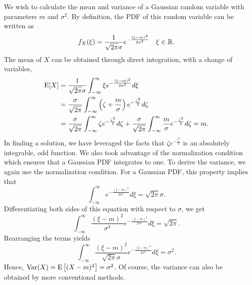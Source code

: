 \begin{example}
We wish to calculate the mean and variance of a Gaussian random variable with parameters $m$ and $\sigma^2$.
By definition, the PDF of this random variable can be written as
\begin{equation*}
f_X (\xi) = \frac{1}{\sqrt{2 \pi} \sigma} e^{-\frac{(\xi - m)^2}{2\sigma^2}}
\quad \xi \in \mathbb{R} .
\end{equation*}
The mean of $X$ can be obtained through direct integration, with a change of variables,
\begin{equation*}
\begin{split}
\mathrm{E} [X]
&= \frac{1}{\sqrt{2 \pi} \sigma} \int_{- \infty}^{\infty} \xi e^{-\frac{(\xi-m)^2}{2\sigma^2}} d\xi \\
&= \frac{\sigma}{\sqrt{2 \pi}} \int_{- \infty}^{\infty}
\left( \zeta+\frac{m}{\sigma} \right) e^{-\frac{\zeta^2}{2}} d\zeta \\
&= \frac{\sigma}{\sqrt{2 \pi}} \int_{- \infty}^{\infty}
\zeta e^{-\frac{\zeta^2}{2}} d\zeta
+ \frac{\sigma}{\sqrt{2 \pi}} \int_{- \infty}^{\infty}
\frac{m}{\sigma} e^{-\frac{\zeta^2}{2}} d\zeta
= m.
\end{split}
\end{equation*}
In finding a solution, we have leveraged the facts that $\zeta e^{-\frac{\zeta^2}{2}}$ is an absolutely integrable, odd function.
We also took advantage of the normalization condition which ensures that a Gaussian PDF integrates to one.
To derive the variance, we again use the normalization condition.
For a Gaussian PDF, this property implies that
\begin{equation*}
\int_{-\infty}^{\infty} e^{- \frac{(\xi-m)^2}{2 \sigma^2}} d\xi
= \sqrt{2 \pi} \sigma .
\end{equation*}
Differentiating both sides of this equation with respect to $\sigma$, we get
\begin{equation*}
\int_{-\infty}^{\infty} \frac{(\xi-m)^2}{\sigma^3}
e^{- \frac{(\xi-m)^2}{2 \sigma^2}} d\xi
= \sqrt{2 \pi} .
\end{equation*}
Rearranging the terms yields
\begin{equation*}
\int_{-\infty}^{\infty} \frac{(\xi-m)^2}{\sqrt{2 \pi} \sigma}
e^{- \frac{(\xi-m)^2}{2 \sigma^2}} d\xi
= \sigma^2 .
\end{equation*}
Hence, $\mathrm{Var}(X) = \mathrm{E} \left[ (X-m)^2 \right] = \sigma^2$.
Of course, the variance can also be obtained by more conventional methods.
\end{example}

